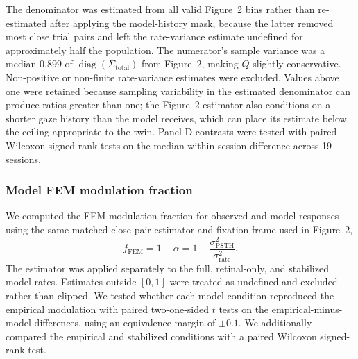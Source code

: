 \documentclass{lite}
\begin{document}
The denominator was estimated from all valid Figure~2 bins rather than re-estimated after applying the model-history mask, because the latter removed most close trial pairs and left the rate-variance estimate undefined for approximately half the population. The numerator's sample variance was a median $0.899$ of $\operatorname{diag}(\Sigma_{\mathrm{total}})$ from Figure~2, making $Q$ slightly conservative. Non-positive or non-finite rate-variance estimates were excluded. Values above one were retained because sampling variability in the estimated denominator can produce ratios greater than one; the Figure~2 estimator also conditions on a shorter gaze history than the model receives, which can place its estimate below the ceiling appropriate to the twin. Panel-D contrasts were tested with paired Wilcoxon signed-rank tests on the median within-session difference across 19 sessions.

\subsubsection{Model FEM modulation fraction}
We computed the FEM modulation fraction for observed and model responses using the same matched close-pair estimator and fixation frame used in Figure~2,
\begin{equation}
f_{\mathrm{FEM}}
=
1-\alpha
=
1-\frac{\sigma^2_{\mathrm{PSTH}}}{\sigma^2_{\mathrm{rate}}}.
\end{equation}
The estimator was applied separately to the full, retinal-only, and stabilized model rates. Estimates outside $[0,1]$ were treated as undefined and excluded rather than clipped. We tested whether each model condition reproduced the empirical modulation with paired two-one-sided $t$ tests on the empirical-minus-model differences, using an equivalence margin of $\pm0.1$. We additionally compared the empirical and stabilized conditions with a paired Wilcoxon signed-rank test.

\end{document}
